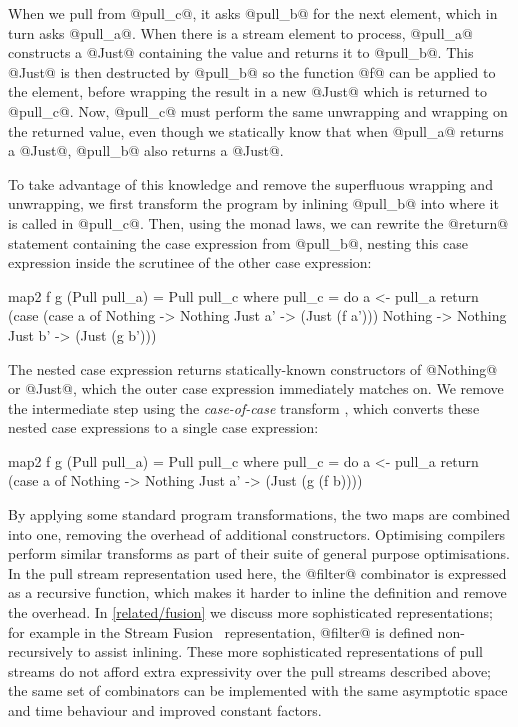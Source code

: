 When we pull from @pull_c@, it asks @pull_b@ for the next element, which in turn asks @pull_a@.
When there is a stream element to process, @pull_a@ constructs a @Just@ containing the value and returns it to @pull_b@.
This @Just@ is then destructed by @pull_b@ so the function @f@ can be applied to the element, before wrapping the result in a new @Just@ which is returned to @pull_c@.
Now, @pull_c@ must perform the same unwrapping and wrapping on the returned value, even though we statically know that when @pull_a@ returns a @Just@, @pull_b@ also returns a @Just@.

To take advantage of this knowledge and remove the superfluous wrapping and unwrapping, we first transform the program by inlining @pull_b@ into where it is called in @pull_c@.
Then, using the monad laws, we can rewrite the @return@ statement containing the case expression from @pull_b@, nesting this case expression inside the scrutinee of the other case expression:

\begin{haskell}
map2 f g (Pull pull_a) = Pull pull_c
 where
  pull_c = do
    a <- pull_a
    return (case (case a of
                   Nothing -> Nothing
                   Just a' -> (Just (f a')))
             Nothing -> Nothing
             Just b' -> (Just (g b')))
\end{haskell}

The nested case expression returns statically-known constructors of @Nothing@ or @Just@, which the outer case expression immediately matches on.
We remove the intermediate step using the \emph{case-of-case} transform \cite{jones1998transformation}, which converts these nested case expressions to a single case expression:
\newpage

\begin{haskell}
map2 f g (Pull pull_a) = Pull pull_c
 where
  pull_c = do
    a <- pull_a
    return (case a of
             Nothing -> Nothing
             Just a' -> (Just (g (f b))))
\end{haskell}

By applying some standard program transformations, the two maps are combined into one, removing the overhead of additional constructors.
Optimising compilers perform similar transforms as part of their suite of general purpose optimisations.
In the pull stream representation used here, the @filter@ combinator is expressed as a recursive function, which makes it harder to inline the definition and remove the overhead.
In \cref{related/fusion} we discuss more sophisticated representations; for example in the Stream Fusion~\cite{coutts2007stream} representation, @filter@ is defined non-recursively to assist inlining.
These more sophisticated representations of pull streams do not afford extra expressivity over the pull streams described above; the same set of combinators can be implemented with the same asymptotic space and time behaviour and improved constant factors.

